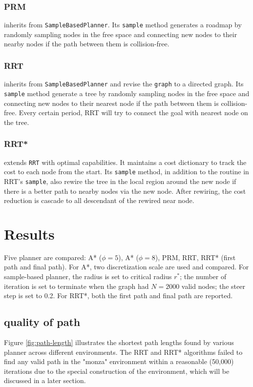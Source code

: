 \documentclass[conference]{IEEEtran}
\begin{document}
\subsubsection{PRM}
inherits from \texttt{SampleBasedPlanner}. 
Its \texttt{sample} method generates a roadmap by 
randomly sampling nodes in the free space and 
connecting new nodes to their nearby nodes if the path between them is collision-free. 

\subsubsection{RRT}
inherits from \texttt{SampleBasedPlanner} and revise the \texttt{graph} to a directed graph. 
Its \texttt{sample} method generate a tree by 
randomly sampling nodes in the free space and
connecting new nodes to their nearest node if the path between them is collision-free.
Every certain period, RRT will try to connect the goal with nearest node on the tree.

\subsubsection{RRT*}
extends \texttt{RRT} with optimal capabilities. 
It maintains a cost dictionary to track the cost to each node from the start. 
Its \texttt{sample} method, in addition to the routine in RRT's \texttt{sample},
also rewire the tree in the local region around the new node if there is a better path to nearby nodes via the new node.
After rewiring, the cost reduction is cascade to all descendant of the rewired near node.

\section{Results}

Five planner are compared: A* ($\phi = 5$), A* ($\phi = 8$),
PRM, RRT, RRT* (first path and final path).
For A*, two discretization scale are used and compared.
For sample-based planner,
the radius is set to critical radius $r^*$;
the number of iteration is set to terminate 
when the graph had $N = 2000$ valid nodes;
the steer step is set to 0.2.
For RRT*, both the first path and final path are reported.

\subsection{quality of path}
Figure \ref{fig:path-length} illustrates the shortest path lengths found 
by various planner across different environments. 
The RRT and RRT* algorithms failed to find any valid path in the "monza" environment 
within a reasonable (50,000) iterations due to the special construction of the environment, 
which will be discussed in a later section.
\end{document}
